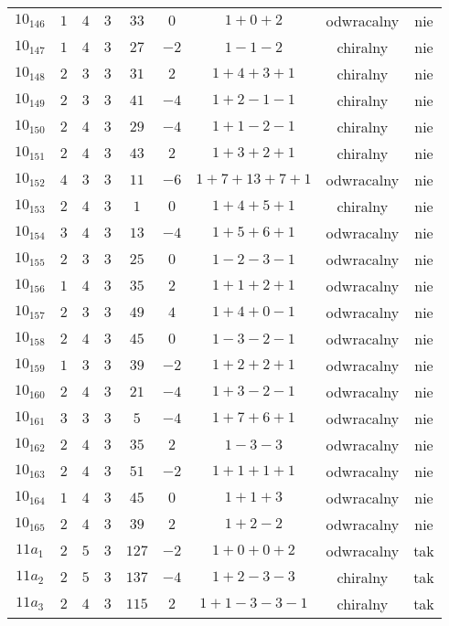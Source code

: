 \begin{longtable}{ccccccccc}
$10_{146}$ & $1$ & $4$ & $3$ & $33$ & $0$ & $1+0+2$ & odwracalny & nie \\
$10_{147}$ & $1$ & $4$ & $3$ & $27$ & $-2$ & $1-1-2$ & chiralny & nie \\
$10_{148}$ & $2$ & $3$ & $3$ & $31$ & $2$ & $1+4+3+1$ & chiralny & nie \\
$10_{149}$ & $2$ & $3$ & $3$ & $41$ & $-4$ & $1+2-1-1$ & chiralny & nie \\
$10_{150}$ & $2$ & $4$ & $3$ & $29$ & $-4$ & $1+1-2-1$ & chiralny & nie \\
$10_{151}$ & $2$ & $4$ & $3$ & $43$ & $2$ & $1+3+2+1$ & chiralny & nie \\
$10_{152}$ & $4$ & $3$ & $3$ & $11$ & $-6$ & $1+7+13+7+1$ & odwracalny & nie \\
$10_{153}$ & $2$ & $4$ & $3$ & $1$ & $0$ & $1+4+5+1$ & chiralny & nie \\
$10_{154}$ & $3$ & $4$ & $3$ & $13$ & $-4$ & $1+5+6+1$ & odwracalny & nie \\
$10_{155}$ & $2$ & $3$ & $3$ & $25$ & $0$ & $1-2-3-1$ & odwracalny & nie \\
$10_{156}$ & $1$ & $4$ & $3$ & $35$ & $2$ & $1+1+2+1$ & odwracalny & nie \\
$10_{157}$ & $2$ & $3$ & $3$ & $49$ & $4$ & $1+4+0-1$ & odwracalny & nie \\
$10_{158}$ & $2$ & $4$ & $3$ & $45$ & $0$ & $1-3-2-1$ & odwracalny & nie \\
$10_{159}$ & $1$ & $3$ & $3$ & $39$ & $-2$ & $1+2+2+1$ & odwracalny & nie \\
$10_{160}$ & $2$ & $4$ & $3$ & $21$ & $-4$ & $1+3-2-1$ & odwracalny & nie \\
$10_{161}$ & $3$ & $3$ & $3$ & $5$ & $-4$ & $1+7+6+1$ & odwracalny & nie \\
$10_{162}$ & $2$ & $4$ & $3$ & $35$ & $2$ & $1-3-3$ & odwracalny & nie \\
$10_{163}$ & $2$ & $4$ & $3$ & $51$ & $-2$ & $1+1+1+1$ & odwracalny & nie \\
$10_{164}$ & $1$ & $4$ & $3$ & $45$ & $0$ & $1+1+3$ & odwracalny & nie \\
$10_{165}$ & $2$ & $4$ & $3$ & $39$ & $2$ & $1+2-2$ & odwracalny & nie \\
$11a_{1}$ & $2$ & $5$ & $3$ & $127$ & $-2$ & $1+0+0+2$ & odwracalny & tak \\
$11a_{2}$ & $2$ & $5$ & $3$ & $137$ & $-4$ & $1+2-3-3$ & chiralny & tak \\
$11a_{3}$ & $2$ & $4$ & $3$ & $115$ & $2$ & $1+1-3-3-1$ & chiralny & tak \\

\end{longtable}

